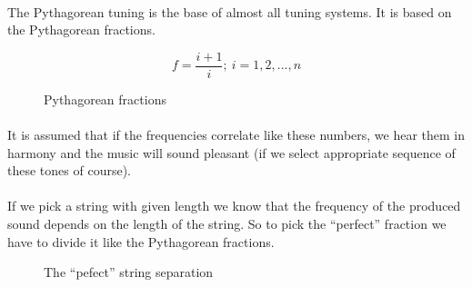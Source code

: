 \documentclass[]{article}
\begin{document}
            \paragraph{} The Pythagorean tuning\cite{pythtun} is the base of almost all tuning systems. It is based on the Pythagorean fractions.\\
                \begin{figure}[h]
                    $$f = \frac{i + 1}{i} ;\ i = 1, 2, ..., n$$
                    \caption{Pythagorean fractions}
                \end{figure}\paragraph{}
                It is assumed that if the frequencies correlate like these numbers, we hear them in harmony and the music will sound pleasant (if we select appropriate sequence of these tones of course).\paragraph{}
                If we pick a string with given length we know that the frequency of the produced sound depends on the length of the string. So to pick the ``perfect'' fraction we have to divide it like the Pythagorean fractions.
                \begin{figure}[h]
                    \begin{center}
                        \caption{The ``pefect'' string separation}            
                    \end{center}
                \end{figure}
\end{document}
